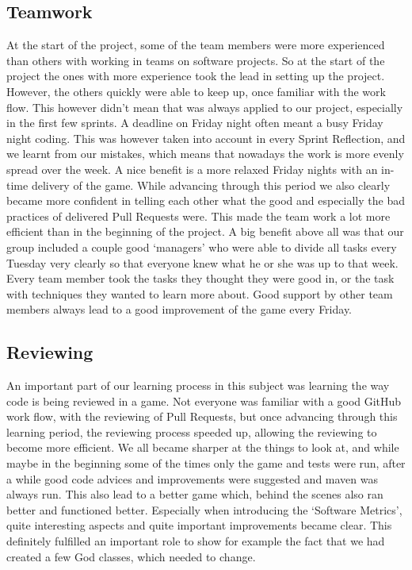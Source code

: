 \subsection{Teamwork}
At the start of the project, some of the team members were more experienced than others with working in teams on software projects. So at the start of the project the ones with more experience took the lead in setting up the project. However, the others quickly were able to keep up, once familiar with the work flow. This however didn't mean that  was always applied to our project, especially in the first few sprints. A deadline on Friday night often meant a busy Friday night coding. This was however taken into account in every Sprint Reflection, and we learnt from our mistakes, which means that nowadays the work is more evenly spread over the week. A nice benefit is a more relaxed Friday nights with an in-time delivery of the game. While advancing through this period we also clearly became more confident in telling each other what the good and especially the bad practices of delivered Pull Requests were. This made the team work a lot more efficient than in the beginning of the project. A big benefit above all was that our group included a couple good `managers' who were able to divide all tasks every Tuesday very clearly so that everyone knew what he or she was up to that week. Every team member took the tasks they thought they were good in, or the task with techniques they wanted to learn more about. Good support by other team members always lead to a good improvement of the game every Friday. 

\subsection{Reviewing}
An important part of our learning process in this subject was learning the way code is being reviewed in a game. Not everyone was familiar with a good GitHub work flow, with the reviewing of Pull Requests, but once advancing through this learning period, the reviewing process speeded up, allowing the reviewing to become more efficient. We all became sharper at the things to look at, and while maybe in the beginning some of the times only the game and tests were run, after a while good code advices and improvements were suggested and maven was always run. This also lead to a better game which, behind the scenes also ran better and functioned better. Especially when introducing the `Software Metrics', quite interesting aspects and quite important improvements became clear. This definitely fulfilled an important role to show for example the fact that we had created a few God classes, which needed to change.  

